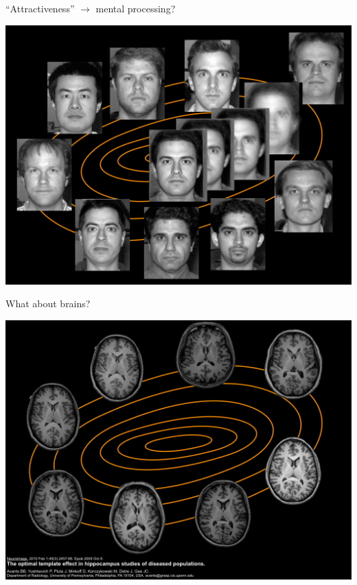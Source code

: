 \documentclass[ignorenonframetext,]{beamer}
\begin{document}
\begin{frame}{``Attractiveness'' $\rightarrow$ mental processing?}

\includegraphics{./Figs/template1.jpg}

\end{frame}

\begin{frame}{What about brains?}

\includegraphics{./Figs/template3.jpg}

\end{frame}
\end{document}
